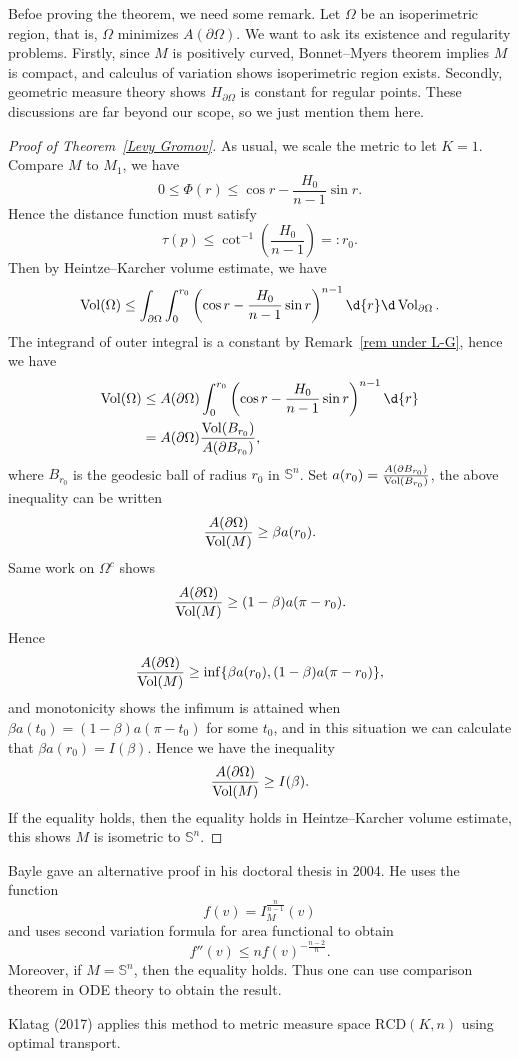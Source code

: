 \begin{rem}\label{rem under L-G}
    Befoe proving the theorem, we need some remark.
    Let $\Omega$ be an isoperimetric region, that is, $\Omega$ minimizes $A(\partial\Omega)$.
    We want to ask its existence and regularity problems.
    Firstly, since $M$ is positively curved, Bonnet--Myers theorem implies $M$ is compact, and calculus of variation shows isoperimetric region exists.
    Secondly, geometric measure theory shows $H_{\partial\Omega}$ is constant for regular points.
    These discussions are far beyond our scope, so we just mention them here.
\end{rem}

\begin{proof}[Proof of Theorem~\ref{Levy Gromov}]
    As usual, we scale the metric to let $K=1$.
    Compare $M$ to $M_1$, we have
    \[0\leq\Phi(r)\leq\cos{r}-\frac{H_0}{n-1}\sin{r}.\]
    Hence the distance function must satisfy
    \[\tau(p)\leq\cot^{-1}\left(\frac{H_0}{n-1}\right)=:r_0.\]
    Then by Heintze--Karcher volume estimate, we have
    \[\Vol(\Omega)\leq\int_{\partial\Omega}\int_0^{r_0}\left(\cos{r}-\frac{H_0}{n-1}\sin{r}\right)^{n-1}\d{r}\d\Vol_{\partial\Omega}.\]
    The integrand of outer integral is a constant by Remark~\ref{rem under L-G}, hence we have
    \begin{align*}
        \Vol(\Omega)&\leq A(\partial\Omega)\int_{0}^{r_0}\left(\cos{r}-\frac{H_0}{n-1}\sin{r}\right)^{n-1}\d{r}\\
        &=A(\partial\Omega)\frac{\Vol(B_{r_0})}{A(\partial B_{r_0})},
    \end{align*}
    where $B_{r_0}$ is the geodesic ball of radius $r_0$ in $\mathbb{S}^n$.
    Set $a(r_0)=\frac{A(\partial B_{r_0})}{\operatorname{Vol}(B_{r_0})}$, the above inequality can be written
    \[\frac{A(\partial\Omega)}{\operatorname{Vol}(M)}\geq\beta a(r_0).\]
    Same work on $\Omega^c$ shows
    \[\frac{A(\partial\Omega)}{\operatorname{Vol}(M)}\geq(1-\beta)a(\pi-r_0).\]
    Hence
    \[\frac{A(\partial\Omega)}{\operatorname{Vol}(M)}\geq\inf\{\beta a(r_0),(1-\beta)a(\pi-r_0)\},\]
    and monotonicity shows the infimum is attained when $\beta a(t_0)=(1-\beta)a(\pi-t_0)$ for some $t_0$, and in this situation we can calculate that $\beta a(r_0)=I(\beta)$.
    Hence we have the inequality
    \[\frac{A(\partial\Omega)}{\operatorname{Vol}(M)}\geq I(\beta).\]
    If the equality holds, then the equality holds in Heintze--Karcher volume estimate, this shows $M$ is isometric to $\mathbb{S}^n$.
\end{proof}

\begin{rem}
    Bayle gave an alternative proof in his doctoral thesis in 2004.
    He uses the function
    \[f(v)=I^{\frac{n}{n-1}}_M(v)\]
    and uses second variation formula for area functional to obtain
    \[f''(v)\leq nf(v)^{-\frac{n-2}{n}}.\]
    Moreover, if $M=\mathbb{S}^n$, then the equality holds.
    Thus one can use comparison theorem in ODE theory to obtain the result.

    Klatag (2017) applies this method to metric measure space $\mathrm{RCD}(K,n)$ using optimal transport.
\end{rem}

